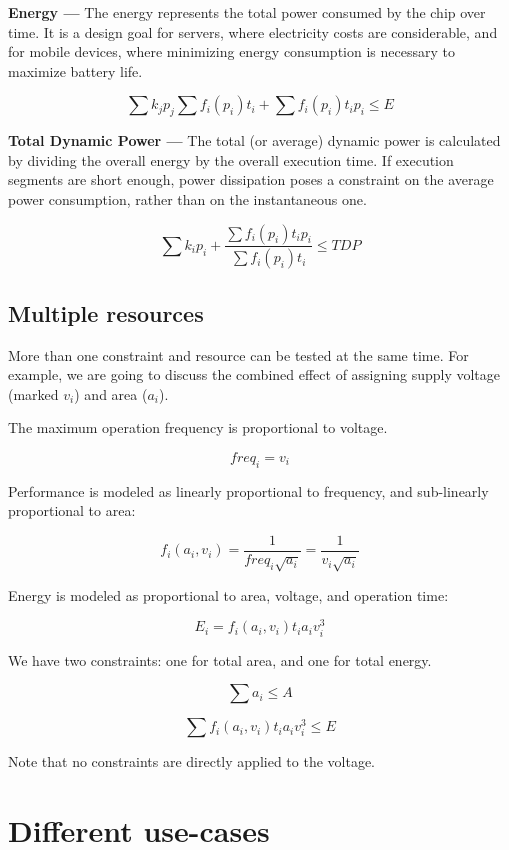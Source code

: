 \documentclass[twocolumn,english]{IEEEtran}
\begin{document}
\textbf{Energy ---} The energy represents the total power consumed
by the chip over time. It is a design goal for servers, where electricity
costs are considerable, and for mobile devices, where minimizing energy
consumption is necessary to maximize battery life. 

\[
\sum k_{j}p_{j}\sum f_{i}(p_{i})t_{i}+\sum f_{i}(p_{i})t_{i}p_{i}\leq E\]


\textbf{Total Dynamic Power ---} The total (or average) dynamic power
is calculated by dividing the overall energy by the overall execution
time. If execution segments are short enough, power dissipation poses
a constraint on the average power consumption, rather than on the
instantaneous one.

\[
\sum k_{i}p_{i}+\frac{\sum f_{i}(p_{i})t_{i}p_{i}}{\sum f_{i}(p_{i})t_{i}}\leq TDP\]



\subsection{Multiple resources}

More than one constraint and resource can be tested at the same time.
For example, we are going to discuss the combined effect of assigning
supply voltage (marked $v_{i}$) and area ($a_{i}$).

The maximum operation frequency is proportional to voltage. 

\[
freq_{i}=v_{i}\]


Performance is modeled as linearly proportional to frequency, and
sub-linearly proportional to area:

\[
f_{i}(a_{i},v_{i})=\frac{1}{freq_{i}\sqrt{a_{i}}}=\frac{1}{v_{i}\sqrt{a_{i}}}\]


Energy is modeled as proportional to area, voltage, and operation
time:

\[
E_{i}=f_{i}(a_{i},v_{i})t_{i}a_{i}v_{i}^{3}\]


We have two constraints: one for total area, and one for total energy.

\[
\sum a_{i}\leq A\]


\[
\sum f_{i}(a_{i},v_{i})t_{i}a_{i}v_{i}^{3}\leq E\]


Note that no constraints are directly applied to the voltage. 

\textbf{}


\section{\label{sec:use-case}Different use-cases}
\end{document}
